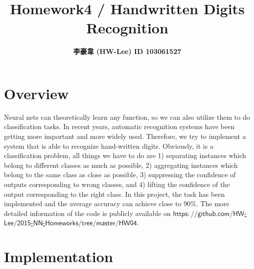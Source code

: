 \documentclass[12pt]{article}
\title{\textbf{Homework4 / Handwritten Digits Recognition}}
\author{\textbf{李豪韋 (HW-Lee) ID 103061527}}
\date{}
\begin{document}
\vspace*{-60pt}
    {\let\newpage\relax\maketitle}

\section*{Overview}
\vspace{-20pt}
\noindent\makebox[\linewidth]{\rule{\textwidth}{0.4pt}}
\vspace{5pt}

Neural nets can theoretically learn any function, so we can also utilize them to do classification tasks. In recent years, automatic recognition systems have been getting more important and more widely used. Therefore, we try to implement a system that is able to recognize hand-written digits. Obviously, it is a classification problem, all things we have to do are 1) separating instances which belong to different classes as much as possible, 2) aggregating instances which belong to the same class as close as possible, 3) suppressing the confidence of outputs corresponding to wrong classes, and 4) lifting the confidence of the output corresponding to the right class. In this project, the task has been implemented and the average accuracy can achieve close to 90$\%$. The more detailed information of the code is publicly available on \href{https://github.com/HW-Lee/2015-NN-Homeworks/tree/master/HW04}{$\mathsf{https://github.com/HW}$-$\mathsf{Lee/2015}$-$\mathsf{NN}$-$\mathsf{Homeworks/tree/master/HW04}$}.

\section*{Implementation}
\vspace{-20pt}
\noindent\makebox[\linewidth]{\rule{\textwidth}{0.4pt}}
\end{document}
